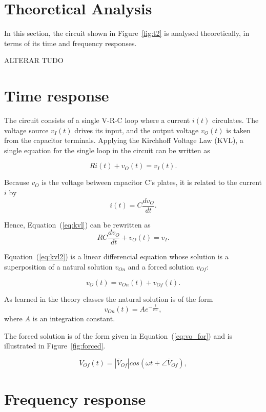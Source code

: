 \section{Theoretical Analysis}
\label{sec:analysis}

In this section, the circuit shown in Figure~\ref{fig:t2} is analysed
theoretically, in terms of its time and frequency responses.

ALTERAR TUDO

\section{Time response}

The circuit consists of a single V-R-C loop where a current $i(t)$ circulates. The
voltage source $v_I(t)$ drives its input, and the output voltage $v_O(t)$ is taken from
the capacitor terminals. Applying the Kirchhoff Voltage Law (KVL), a single
equation for the single loop in the circuit can be written as

\begin{equation}
  Ri(t) + v_O(t) = v_I(t).
  \label{eq:kvl}
\end{equation}

Because $v_O$ is the voltage between capacitor C's plates, it is related to the
current $i$ by
\begin{equation}
  i(t) = C\frac{dv_O}{dt}.
\end{equation}

Hence, Equation~(\ref{eq:kvl}) can be rewritten as
\begin{equation}
  RC\frac{dv_O}{dt} + v_O(t) = v_I.
  \label{eq:kvl2}
\end{equation}

Equation~(\ref{eq:kvl2}) is a linear differencial equation whose solution is a
superposition of a natural solution $v_{On}$ and a forced solution $v_{Of}$:

\begin{equation}
  v_O(t) = v_{On}(t) + v_{Of}(t).
  \label{eq:vo_sol}
\end{equation}

As learned in the theory classes the natural solution is of the form
\begin{equation}
  v_{On}(t) = Ae^{-\frac{t}{RC}},
  \label{eq:vo_nat}
\end{equation}
where $A$ is an integration constant.

The forced solution is of the form given in Equation~(\ref{eq:vo_for}) and is
illustrated in Figure~\ref{fig:forced}.

\begin{equation}
  V_{Of}(t) = |\bar{V}_{Of}| cos(\omega t + \angle \bar{V}_{Of}),
  \label{eq:vo_for}
\end{equation}

\lipsum[1-1]



\section{Frequency response}

\lipsum[1-1]


